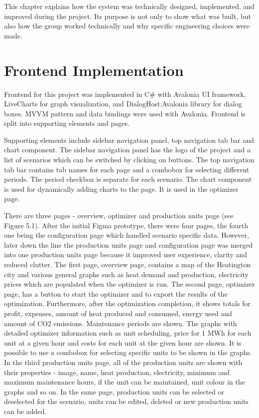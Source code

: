 This chapter explains how the system was technically designed,
implemented, and improved during the project. Its purpose is not only to
show what was built, but also how the group worked technically and why
specific engineering choices were made.

\section{Frontend Implementation}

Frontend for this project was implemented in C\# with Avalonia UI framework, LiveCharts for graph visualization, and DialogHost.Avalonia library for dialog boxes. MVVM pattern and data bindings were used with Avalonia. Frontend is split into supporting elements and pages.\par
Supporting elements include sidebar navigation panel, top navigation tab bar and chart component. The sidebar navigation panel has the logo of the project and a list of scenarios which can be switched by clicking on buttons. The top navigation tab bar contains tab names for each page and a combobox for selecting different periods. The period checkbox is separate for each scenario. The chart component is used for dynamically adding charts to the page. It is used in the optimizer page.\par
There are three pages - overview, optimizer and production units page (see Figure 5.1). After the initial Figma prototype, there were four pages, the fourth one being the configuration page which handled scenario specific data. However, later down the line the production units page and configuration page was merged into one production units page because it improved user experience, clarity and reduced clutter. The first page, overview page, contains a map of the Heatington city and various general graphs such as heat demand and production, electricity prices which are populated when the optimizer is run. The second page, optimizer page, has a button to start the optimizer and to export the results of the optimization. Furthermore, after the optimization completion, it shows totals for profit, expenses, amount of heat produced and consumed, energy used and amount of CO2 emissions. Maintenance periods are shown. The graphs with detailed optimizer information such as unit scheduling, price for 1 MWh for each unit at a given hour and costs for each unit at the given hour are shown. It is possible to use a combobox for selecting specific units to be shown in the graphs. In the third production units page, all of the production units are shown with their properties - image, name, heat production, electricity, minimum and maximum maintenance hours, if the unit can be maintained, unit colour in the graphs and so on. In the same page, production units can be selected or deselected for the scenario, units can be edited, deleted or new production units can be added.\par

